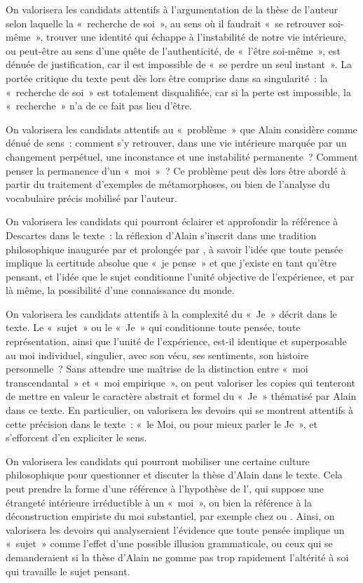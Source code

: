 		{On valorisera les candidats attentifs à l'argumentation de la thèse de l'auteur
selon laquelle la «~recherche de soi~», au sens où il faudrait «~se retrouver soi-même~»,
trouver une identité qui échappe à l'instabilité de notre vie intérieure, ou peut-être au
sens d'une quête de l'authenticité, de «~l'être soi-même~», est dénuée de justification,
car il est impossible de «~se perdre un seul instant~». La portée critique du texte peut
dès lors être comprise dans sa singularité~: la «~recherche de soi~» est totalement
disqualifiée, car si la perte est impossible, la «~recherche~» n'a de ce fait pas lieu d'être.

On valorisera les candidats attentifs au «~problème~» que Alain considère
comme dénué de sens~: comment s'y retrouver, dans une vie intérieure marquée par
un changement perpétuel, une inconstance et une instabilité permanente~? Comment
penser la permanence d'un «~moi~»~? Ce problème peut dès lors être abordé à partir
du traitement d'exemples de métamorphoses, ou bien de l'analyse du vocabulaire
précis mobilisé par l'auteur.

On valorisera les candidats qui pourront éclairer et approfondir la référence à
Descartes dans le texte~: la réflexion d'Alain s'inscrit dans une tradition philosophique
inaugurée par  et prolongée par , à savoir l'idée que toute pensée
implique la certitude absolue que «~je pense~» et que j'existe en tant qu'être pensant,
et l'idée que le sujet conditionne l'unité objective de l'expérience, et par là même, la
possibilité d'une connaissance du monde.

On valorisera les candidats attentifs à la complexité du «~Je~» décrit dans le
texte. Le «~sujet~» ou le «~Je~» qui conditionne toute pensée, toute représentation, ainsi que l'unité de l'expérience, est-il identique et superposable au moi individuel, singulier,
avec son vécu, ses sentiments, son histoire personnelle~? Sans attendre une maîtrise
de la distinction entre «~moi transcendantal~» et «~moi empirique~», on peut valoriser
les copies qui tenteront de mettre en valeur le caractère abstrait et formel du «~Je~»
thématisé par Alain dans ce texte. En particulier, on valorisera les devoirs qui se
montrent attentifs à cette précision dans le texte~: «~le Moi, ou pour mieux parler le
Je~», et s'efforcent d'en expliciter le sens.

On valorisera les candidats qui pourront mobiliser une certaine culture
philosophique pour questionner et discuter la thèse d'Alain dans le texte. Cela peut
prendre la forme d'une référence à l'hypothèse de l', qui suppose une
étrangeté intérieure irréductible à un «~moi~», ou bien la référence à la déconstruction
empiriste du moi substantiel, par exemple chez  ou . Ainsi, on
valorisera les devoirs qui analyseraient l'évidence que toute pensée implique un
«~sujet~» comme l'effet d'une possible illusion grammaticale, ou ceux qui se
demanderaient si la thèse d'Alain ne gomme pas trop rapidement l'altérité à soi qui
travaille le sujet pensant.
}%
